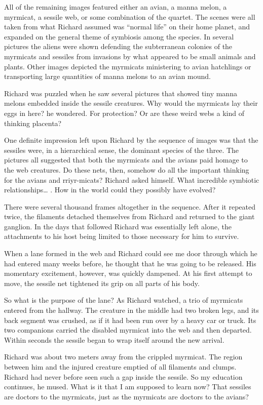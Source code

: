 \documentclass[]{article}
\begin{document}
{{All of the remaining images featured either an avian, a manna melon, a myrmicat, a sessile web, or some combination of the quartet. The scenes were all taken from what Richard assumed was “normal life” on their home planet, and expanded on the general theme of symbiosis among the species. In several pictures the aliens were shown defending the subterranean colonies of the myrmicats and sessiles from invasions by what appeared to be small animals and plants. Other images depicted the myrmicats ministering to avian hatchlings or transporting large quantities of manna melons to an avian mound.

Richard was puzzled when he saw several pictures that showed tiny manna melons embedded inside the sessile creatures. Why would the myrmicats lay their eggs in here? he wondered. For protection? Or are these weird webs a kind of thinking placenta?

One definite impression left upon Richard by the sequence of images was that the sessiles were, in a hierarchical sense, the dominant species of the three. The pictures all suggested that both the myrmicats and the avians paid homage to the web creatures. Do these nets, then, somehow do all the important thinking for the avians and rriyr-micats? Richard asked himself. What incredible symbiotic relationships… . How in the world could they possibly have evolved?

There were several thousand frames altogether in the sequence. After it repeated twice, the filaments detached themselves from Richard and returned to the giant ganglion. In the days that followed Richard was essentially left alone, the attachments to his host being limited to those necessary for him to survive.

When a lane formed in the web and Richard could see me door through which he had entered many weeks before, he thought that he was going to be released. His momentary excitement, however, was quickly dampened. At his first attempt to move, the sessile net tightened its grip on all parts of his body.

So what is the purpose of the lane? As Richard watched, a trio of myrmicats entered from the hallway. The creature in the middle had two broken legs, and its back segment was crushed, as if it had been run over by a heavy car or truck. Its two companions carried the disabled myrmicat into the web and then departed. Within seconds the sessile began to wrap itself around the new arrival.

Richard was about two meters away from the crippled myrmicat. The region between him and the injured creature emptied of all filaments and clumps. Richard had never before seen such a gap inside the sessile. So my education continues, he mused. What is it that I am supposed to learn now? That sessiles are doctors to the myrmicats, just as the myrmicats are doctors to the avians?

}}
\end{document}
